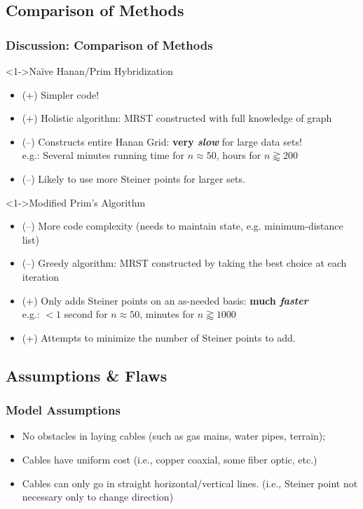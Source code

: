 \documentclass{beamer}
\begin{document}
\subsection{Comparison of Methods}
\begin{frame}
\frametitle{Discussion: Comparison of Methods}
\begin{block}<1->{Na\"{i}ve Hanan/Prim Hybridization}
\scriptsize\begin{itemize}
\item<2-> {	 (+) Simpler code! }
\item<3-> {  (+) Holistic algorithm: MRST constructed with full knowledge of graph }
\item<4-> { (--) Constructs entire Hanan Grid: \textbf{very \em{slow}} for large data sets!  \\
e.g.: Several minutes running time for  \(n \approx 50\), hours for \(n \gtrapprox 200\) }
\item<5-> { (--) Likely to use more Steiner points for larger sets. } 
\end{itemize}
\end{block}
\begin{block}<1->{Modified Prim's Algorithm}
\scriptsize\begin{itemize}
\item<2-> {(--) More code complexity (needs to maintain state, e.g. minimum-distance list)} 
\item<3-> {(--) Greedy algorithm: MRST constructed by taking the best choice at each iteration}
\item<4-> { (+) Only adds Steiner points on an as-needed basis: \textbf{much \em{faster}} \\
e.g.: \(< 1\) second  for  \(n \approx 50\), minutes for \(n \gtrapprox 1000\) }
\item<5-> { (+) Attempts to minimize the number of Steiner points to add. }
\end{itemize}
\end{block}
\end{frame}

\subsection{Assumptions \& Flaws}
\begin{frame}
\frametitle{Model Assumptions}
\begin{itemize}
\item<1-> { No obstacles in laying cables (such as gas mains, water pipes, terrain); }
\item<2-> { Cables have uniform cost (i.e., copper coaxial, some fiber optic, etc.) }
\item<3-> { Cables can only go in straight horizontal/vertical lines.
(i.e., Steiner point not necessary only to change direction) }
\end{itemize}
\end{frame}	
\end{document}
